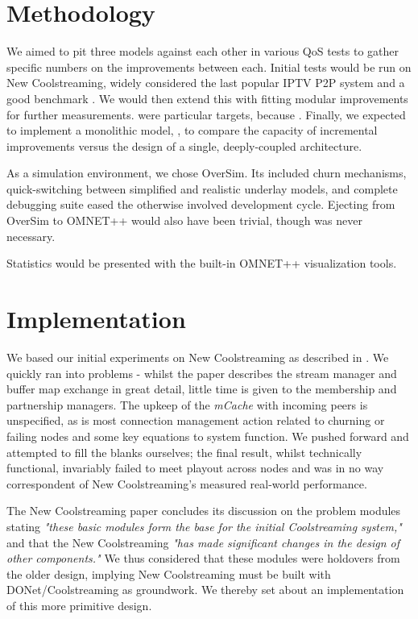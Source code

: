 \documentclass[12pt,a4paper]{article}
\begin{document}
\section{Methodology} \label{methodology}
We aimed to pit three models against each other in various QoS tests  to gather specific numbers on the improvements between each. Initial tests would be run on New Coolstreaming, widely considered the last popular IPTV P2P system and a good benchmark . We would then extend this with fitting modular improvements for further measurements.  were particular targets, because . Finally, we expected to implement a monolithic model, , to compare the capacity of incremental improvements versus the design of a single, deeply-coupled architecture.

As a simulation environment, we chose OverSim. Its included churn mechanisms, quick-switching between simplified and realistic underlay models, and complete debugging suite eased the otherwise involved development cycle. Ejecting from OverSim to OMNET++ would also have been trivial, though was never necessary.

Statistics would be presented with the built-in OMNET++ visualization tools.

\section{Implementation} \label{implementation}
We based our initial experiments on New Coolstreaming as described in \cite{Li2008}. We quickly ran into problems - whilst the paper describes the stream manager and buffer map exchange in great detail, little time is given to the membership and partnership managers. The upkeep of the \textit{mCache} with incoming peers is unspecified, as is most connection management action related to churning or failing nodes and some key equations to system function. We pushed forward and attempted to fill the blanks ourselves; the final result, whilst technically functional, invariably failed to meet playout across nodes and was in no way correspondent of New Coolstreaming's measured real-world performance.

The New Coolstreaming paper concludes its discussion on the problem modules stating \textit{"these basic modules form the base for the initial Coolstreaming system,"} and that the New Coolstreaming \textit{"has made significant changes in the design of other components."} We thus considered that these modules were holdovers from the older design, implying New Coolstreaming must be built with  DONet/Coolstreaming as groundwork. We thereby set about an implementation of this more primitive design.
\end{document}
